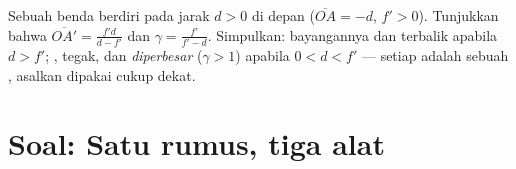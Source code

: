 \begin{exercise}[$\star\star\star$]\label{exo:g11:lenses-and-eye:15}
Sebuah benda  berdiri pada jarak $d > 0$ di depan 
($\overline{OA} = -d$, $f' > 0$). Tunjukkan bahwa
$\overline{OA'} = \frac{f'd}{d - f'}$ dan
$\gamma = \frac{f'}{f' - d}$. Simpulkan: bayangannya  dan terbalik
apabila $d > f'$; , tegak, dan \emph{diperbesar} ($\gamma > 1$)
apabila $0 < d < f'$ --- setiap  adalah sebuah , asalkan
dipakai cukup dekat.
\end{exercise}

\section{Soal: Satu rumus, tiga alat}

